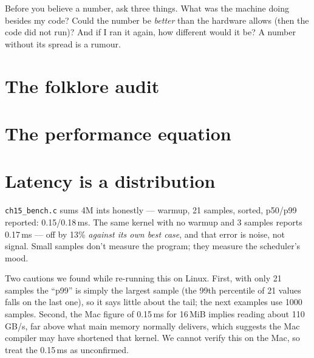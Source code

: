 \begin{principle}
Before you believe a number, ask three things. What was the machine
doing besides my code? Could the number be \emph{better} than the
hardware allows (then the code did not run)? And if I ran it again,
how different would it be? A number without its spread is a rumour.
\end{principle}

\section{The folklore audit}


\section{The performance equation}


\section{Latency is a distribution}


\begin{example}
\texttt{ch15\_bench.c} sums 4M ints honestly --- warmup, 21
samples, sorted, p50/p99 reported: 0.15/0.18\,ms. The same kernel
with no warmup and 3 samples reports 0.17\,ms --- off by 13\%
\emph{against its own best case}, and that error is noise, not
signal. Small samples don't measure the program; they measure
the scheduler's mood.

Two cautions we found while re-running this on Linux. First, with
only 21 samples the ``p99'' is simply the largest sample (the 99th
percentile of 21 values falls on the last one), so it says little
about the tail; the next examples use 1000 samples. Second, the Mac
figure of 0.15\,ms for 16\,MiB implies reading about 110\,GB/s, far
above what main memory normally delivers, which suggests the Mac
compiler may have shortened that kernel. We cannot verify this on the
Mac, so treat the 0.15\,ms as unconfirmed.
\end{example}

